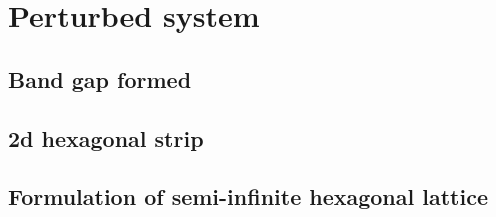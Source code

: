 \chapter{Perturbed system}
\label{perturbed}

\section{Band gap formed}

\section{2d hexagonal strip}

\section{Formulation of semi-infinite hexagonal lattice}
